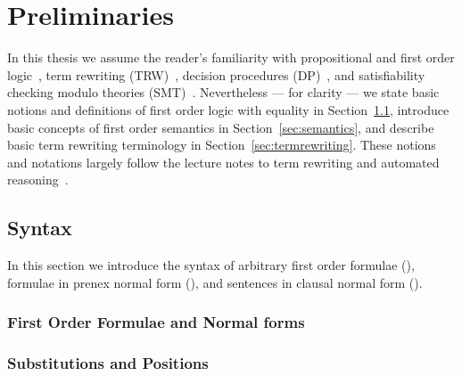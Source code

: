 
\chapter{Preliminaries}

%

In this thesis we assume the reader's familiarity with
propositional and first order logic~\cite{Huth:2004:LCS:975331},
term rewriting (TRW)~\cite{Baader:1998:TR:280474},
decision procedures (DP)~\cite{Kroening:2008:DPA:1391237},
and satisfiability checking modulo theories (SMT)~\cite{Biere:2009:HSV:1550723}.
Nevertheless --- for clarity --- we state basic notions and  definitions
of first order logic with equality in Section~\ref{sec:syntax},
introduce basic concepts of first order semantics in Section~\ref{sec:semantics},
and describe basic term rewriting terminology in Section~\ref{sec:termrewriting}.
These notions and notations largely follow the lecture notes to term rewriting and automated reasoning~\cite{AM2015tr, GM2013ar}.

\section{Syntax}\label{sec:syntax}

In this section we introduce the syntax of arbitrary first order formulae (\FOF),
formulae in prenex normal form (\PNF),
and sentences in clausal normal form (\CNF).







\subsection{First Order Formulae and Normal forms}





\subsection{Substitutions and Positions}


